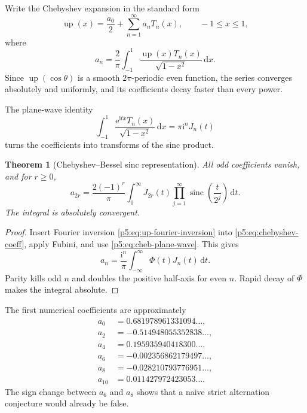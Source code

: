 \documentclass[11pt,oneside]{article}
\newtheorem{theorem}{Theorem}[section]
\theoremstyle{definition}
\newcommand{\dd}{\,\mathrm d}
\newcommand{\e}{\mathrm e}
\newcommand{\ii}{\mathrm i}
\newcommand{\Up}{\operatorname{up}}
\newcommand{\sinc}{\operatorname{sinc}}
\begin{document}
Write the Chebyshev expansion in the standard form
\begin{equation}
 \Up(x)=\frac{a_0}{2}+\sum_{n=1}^\infty a_nT_n(x),
 \qquad -1\le x\le1,                                    \label{p5:eq:chebyshev-series}
\end{equation}
where
\begin{equation}
 a_n=\frac2\pi\int_{-1}^{1}
 \frac{\Up(x)T_n(x)}{\sqrt{1-x^2}}\dd x.                \label{p5:eq:chebyshev-coeff}
\end{equation}
Since $\Up(\cos\theta)$ is a smooth $2\pi$-periodic even function, the
series converges absolutely and uniformly, and its coefficients decay faster
than every power.

The plane-wave identity
\begin{equation}
 \int_{-1}^{1}\frac{\e^{\ii tx}T_n(x)}{\sqrt{1-x^2}}\dd x
 =\pi\ii^nJ_n(t)                                        \label{p5:eq:cheb-plane-wave}
\end{equation}
turns the coefficients into transforms of the sinc product.

\begin{theorem}[Chebyshev--Bessel sinc representation]
\label{p5:thm:cheb-bessel}
All odd coefficients vanish, and for $r\ge0$,
\begin{equation}
 \boxed{\displaystyle
 a_{2r}=\frac{2(-1)^r}{\pi}
 \int_0^\infty J_{2r}(t)
 \prod_{j=1}^\infty\sinc\!\left(\frac{t}{2^j}\right)\dd t.} \label{p5:eq:cheb-bessel}
\end{equation}
The integral is absolutely convergent.
\end{theorem}

\begin{proof}
Insert Fourier inversion \eqref{p5:eq:up-fourier-inversion} into
\eqref{p5:eq:chebyshev-coeff}, apply Fubini, and use
\eqref{p5:eq:cheb-plane-wave}.  This gives
\[
 a_n=\frac{\ii^n}{\pi}\int_{-\infty}^{\infty}\Phi(t)J_n(t)\dd t.
\]
Parity kills odd $n$ and doubles the positive half-axis for even $n$.
Rapid decay of $\Phi$ makes the integral absolute.
\end{proof}

The first numerical coefficients are approximately
\begin{equation}
 \begin{split}
 a_0&= 0.681978961331094\ldots,\\
 a_2&=-0.514948055352838\ldots,\\
 a_4&= 0.195935940418300\ldots,\\
 a_6&=-0.002356862179497\ldots,\\
 a_8&=-0.028210793776951\ldots,\\
 a_{10}&=0.011427972423053\ldots.
 \end{split}                                             \label{p5:eq:cheb-first}
\end{equation}
The sign change between $a_6$ and $a_8$ shows that a naive strict alternation
conjecture would already be false.
\end{document}

